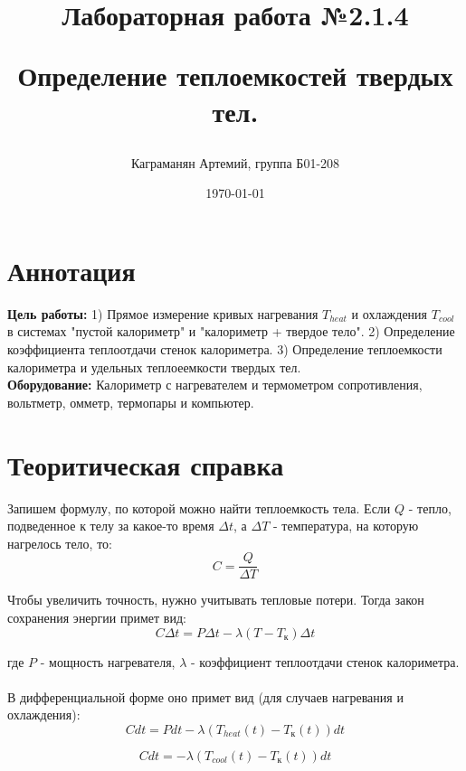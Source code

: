 \documentclass[a4paper, 12pt]{article}
\title{\begin{center}Лабораторная работа №2.1.4\end{center}
Определение теплоемкостей твердых тел.}
\author{Каграманян Артемий, группа Б01-208}
\date{\today}
\begin{document}
\maketitle

\section{Аннотация}
\textbf{Цель работы:} 1) Прямое измерение кривых нагревания \(T_{heat}\) и охлаждения \(T_{cool}\) в системах "пустой калориметр" и "калориметр + твердое тело". 2) Определение коэффициента теплоотдачи стенок калориметра. 3) Определение теплоемкости калориметра и удельных теплоеемкости твердых тел.\\
\textbf{Оборудование:} Калориметр с нагревателем и термометром сопротивления, вольтметр, омметр, термопары и компьютер.
\section{Теоритическая справка}
Запишем формулу, по которой можно найти теплоемкость тела. Если \(Q\) - тепло, подведенное к телу за какое-то время \(\Delta t\), а \(\Delta T\) - температура, на которую нагрелось тело, то:
\begin{equation}
    C = \frac{Q}{\Delta T}
\end{equation}

Чтобы увеличить точность, нужно учитывать тепловые потери. Тогда закон сохранения энергии примет вид:
\begin{equation}
    C \Delta t = P \Delta t - \lambda (T - T_к) \Delta t
\end{equation}

где \(P\) - мощность нагревателя, \( \lambda \) - коэффициент теплоотдачи стенок калориметра.\\
\\
В дифференциальной форме оно примет вид (для случаев нагревания и охлаждения):
\begin{equation}
    Cdt = Pdt - \lambda (T_{heat}(t) - T_к (t)) dt
\end{equation}

\begin{equation}
    Cdt = -\lambda (T_{cool}(t) - T_к (t)) dt
\end{equation}

\newpage
\end{document}

